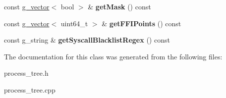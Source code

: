 \begin{DoxyCompactItemize}
\item 
\hypertarget{classProcessTreeNode_aabd4c5d6d0999280747eda6333e0a8a1}{const \hyperlink{classg__vector}{g\-\_\-vector}$<$ bool $>$ \& {\bfseries get\-Mask} () const }\label{classProcessTreeNode_aabd4c5d6d0999280747eda6333e0a8a1}

\item 
\hypertarget{classProcessTreeNode_a74efcea43d5a091816035483cb98e8b7}{const \hyperlink{classg__vector}{g\-\_\-vector}$<$ uint64\-\_\-t $>$ \& {\bfseries get\-F\-F\-I\-Points} () const }\label{classProcessTreeNode_a74efcea43d5a091816035483cb98e8b7}

\item 
\hypertarget{classProcessTreeNode_a6c3b641be0e6727060ef2723fd2d8435}{const g\-\_\-string \& {\bfseries get\-Syscall\-Blacklist\-Regex} () const }\label{classProcessTreeNode_a6c3b641be0e6727060ef2723fd2d8435}

\end{DoxyCompactItemize}


The documentation for this class was generated from the following files\-:\begin{DoxyCompactItemize}
\item 
process\-\_\-tree.\-h\item 
process\-\_\-tree.\-cpp\end{DoxyCompactItemize}
